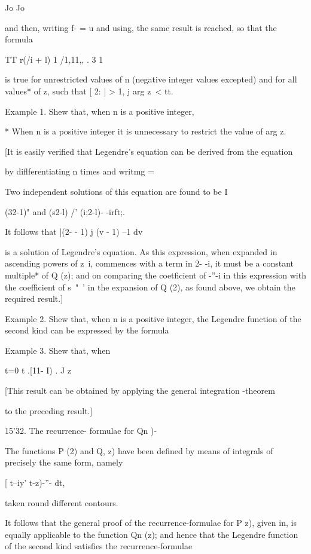 {{Jo Jo

and then, writing f- = u and using, the same result is
reached, so that the formula

TT r(/i + l) 1 /1,11,, . 3 1

is true for unrestricted values of n (negative integer values
excepted) and for all values* of z, such that [ 2: | > 1, j arg z\ <
tt.

Example 1. Shew that, when n is a positive integer,

* When n is a positive integer it is unnecessary to restrict the value
of arg z.

%
%

[It is easily verified that Legendre's equation can be derived from
the equation

by diflferentiating n times and writmg = 

Two independent solutions of this equation are found to be I

(32-1)" and (s2-l) /' (i;2-l)- -irft;.

It follows that |(2- - 1) j (v - 1) --1 dv

is a solution of Legendre's equation. As this expression, when
expanded in ascending powers of z~i, commences with a term in 2- -i,
it must be a constant multiple* of Q (z); and on comparing the
coetficient of -''-i in this expression with the coefficient of s~"~'
in the expansion of Q (2), as found above, we obtain the required
result.]

Example 2. Shew that, when n is a positive integer, the Legendre
function of the second kind can be expressed by the formula

Example 3. Shew that, when %

t=0 t .[11- I) . J z

[This result can be obtained by applying the general integration
-theorem

to the preceding result.]

15'32. The recurrence- formulae for Qn )-

The functions P (2) and Q, z) have been defined by means of integrals
of precisely the same form, namely

[ t--iy' t-z)-''- dt,

taken round different contours.

It follows that the general proof of the recurrence-formulae for P z),
given in, is equally applicable to the function Qn (z); and
hence that the Legendre function of the second kind satisfies the
recurrence-formulae

}}
